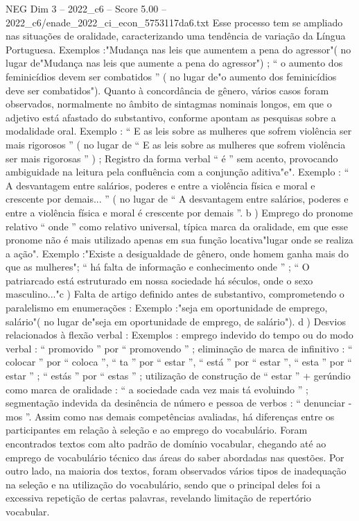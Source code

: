 \begin{textsample}{NEG Dim 3 – 2022\_c6 – Score 5.00 – 2022\_c6/enade\_2022\_ci\_econ\_5753117da6.txt}
Esse processo tem se ampliado nas situações de oralidade, caracterizando uma tendência de variação da Língua Portuguesa.
Exemplos :"Mudança nas leis que aumentem a pena do agressor"( no lugar de"Mudança nas leis que aumente a pena do agressor") ; “ o aumento dos feminicídios devem ser combatidos ” ( no lugar de"o aumento dos feminicídios deve ser combatidos").
Quanto à concordância de gênero, vários casos foram observados, normalmente no âmbito de sintagmas nominais longos, em que o adjetivo está afastado do substantivo, conforme apontam as pesquisas sobre a modalidade oral.
Exemplo : “ E as leis sobre as mulheres que sofrem violência ser mais rigorosos ” ( no lugar de “ E as leis sobre as mulheres que sofrem violência ser mais rigorosas ” ) ; Registro da forma verbal “ é ” sem acento, provocando ambiguidade na leitura pela confluência com a conjunção aditiva"e".
Exemplo : “ A desvantagem entre salários, poderes e entre a violência física e moral e crescente por demais... ” ( no lugar de “ A desvantagem entre salários, poderes e entre a violência física e moral é crescente por demais ”. b ) Emprego do pronome relativo “ onde ” como relativo universal, típica marca da oralidade, em que esse pronome não é mais utilizado apenas em sua função locativa"lugar onde se realiza a ação".
Exemplo :"Existe a desigualdade de gênero, onde homem ganha mais do que as mulheres"; “ há falta de informação e conhecimento onde ” ; “ O patriarcado está estruturado em nossa sociedade há séculos, onde o sexo masculino..."c ) Falta de artigo definido antes de substantivo, comprometendo o paralelismo em enumerações : Exemplo :"seja em oportunidade de emprego, salário"( no lugar de"seja em oportunidade de emprego, de salário"). d ) Desvios relacionados à flexão verbal : Exemplos : emprego indevido do tempo ou do modo verbal : “ promovido ” por “ promovendo ” ; eliminação de marca de infinitivo : “ colocar ” por “ coloca ”, “ ta ” por “ estar ”, “ está ” por “ estar ”, “ esta ” por “ estar ” ; “ estás ” por “ estas ” ; utilização de construção de “ estar ” + gerúndio como marca de oralidade : “ a sociedade cada vez mais tá evoluindo ” ; segmentação indevida da desinência de número e pessoa de verbos : “ denunciar -mos ”.
Assim como nas demais competências avaliadas, há diferenças entre os participantes em relação à seleção e ao emprego do vocabulário.
Foram encontrados textos com alto padrão de domínio vocabular, chegando até ao emprego de vocabulário técnico das áreas do saber abordadas nas questões.
Por outro lado, na maioria dos textos, foram observados vários tipos de inadequação na seleção e na utilização do vocabulário, sendo que o principal deles foi a excessiva repetição de certas palavras, revelando limitação de repertório vocabular.

\end{textsample}
